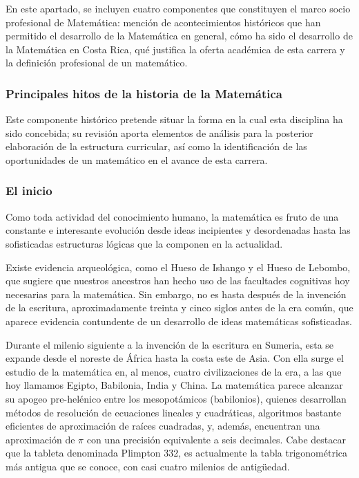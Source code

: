 En este apartado, se incluyen cuatro componentes que constituyen el marco socio profesional de Matemática: mención de acontecimientos históricos que han permitido el desarrollo de la Matemática en general, cómo ha sido el desarrollo de la Matemática en Costa Rica, qué justifica la oferta académica de esta carrera y la definición profesional de un matemático.  

\subsubsection{Principales hitos de la historia de la Matemática}
 
Este componente histórico pretende situar la forma en la cual esta disciplina ha sido concebida; su revisión aporta elementos de análisis para la posterior elaboración de la estructura curricular, así como la identificación de las oportunidades de un matemático en el avance de esta carrera. 

\subsubsection*{El inicio}

Como toda actividad del conocimiento humano, la matemática es fruto de una constante e interesante evolución desde ideas incipientes y desordenadas hasta las sofisticadas estructuras lógicas que la componen en la actualidad. 

Existe evidencia arqueológica, como el Hueso de Ishango y el Hueso de Lebombo, que sugiere que nuestros ancestros han hecho uso de las facultades cognitivas hoy necesarias para la matemática. Sin embargo, no es hasta después de la invención de la escritura, aproximadamente treinta y cinco siglos antes de la era común, que aparece evidencia contundente de un desarrollo de ideas matemáticas sofisticadas.

Durante el milenio siguiente a la invención de la escritura en Sumeria, esta se expande desde el noreste de África hasta la costa este de Asia. Con ella surge el estudio de la matemática en, al menos, cuatro civilizaciones de la era, a las que hoy llamamos Egipto, Babilonia, India y China. La matemática parece alcanzar su apogeo pre-helénico entre los mesopotámicos (babilonios), quienes desarrollan métodos de resolución de ecuaciones lineales y cuadráticas, algoritmos bastante eficientes de aproximación de raíces cuadradas, y, además, encuentran una aproximación de $\pi$ con una precisión equivalente a seis decimales. Cabe destacar que la tableta denominada Plimpton 332, es actualmente la tabla trigonométrica más antigua que se conoce, con casi cuatro milenios de antigüedad.

